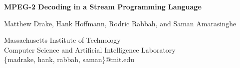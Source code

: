 \documentclass[10pt]{article}
\newcommand{\abTitle}[1]{\begin{center}\textbf{{\Large \bf #1}}\end{center}}
\newcommand{\authors}[1]{\begin{center}{\large #1}\end{center}}
\newenvironment{ipdpsabstract}{}{}
\newenvironment{oddaffiliation}{\begin{center}}{\\~\\\end{center}}
\begin{document}
\abTitle{MPEG-2 Decoding in a Stream Programming Language}

\authors{Matthew Drake, Hank Hoffmann, Rodric Rabbah, and Saman Amarasinghe}

\begin{oddaffiliation}
  Massachusetts Institute of Technology\\
  Computer Science and Artificial Intelligence Laboratory\\
  \{madrake, hank, rabbah, saman\}@mit.edu
\end{oddaffiliation}

\begin{ipdpsabstract}
  
\end{ipdpsabstract}
\end{document}
